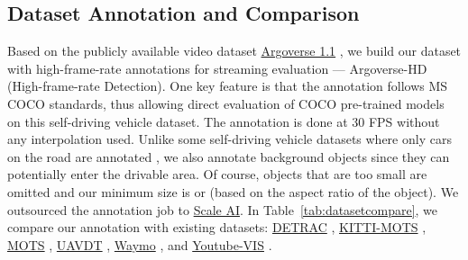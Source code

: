 \subsection{Dataset Annotation and Comparison}
\label{app:datasetcompare}

Based on the publicly available video dataset \href{https://www.argoverse.org/}{Argoverse 1.1} \cite{Argoverse}, we build our dataset with high-frame-rate annotations for streaming evaluation --- Argoverse-HD (High-frame-rate Detection). One key feature is that the annotation follows MS COCO \cite{lin2014microsoft} standards, thus allowing direct evaluation of COCO pre-trained models on this self-driving vehicle dataset. The annotation is done at 30 FPS without any interpolation used. Unlike some self-driving vehicle datasets where only cars on the road are annotated \cite{Voigtlaender19CVPR_MOTS}, we also annotate background objects since they can potentially enter the drivable area. Of course, objects that are too small are omitted and our minimum size is  or  (based on the aspect ratio of the object). We outsourced the annotation job to \href{https://scale.com/}{Scale AI}. In Table~\ref{tab:datasetcompare}, we compare our annotation with existing datasets:
\href{https://detrac-db.rit.albany.edu/Tracking}{DETRAC} \cite{DETRAC:CoRR:WenDCLCQLYL15},
\href{http://www.vision.rwth-aachen.de/page/mots}{KITTI-MOTS} \cite{Voigtlaender19CVPR_MOTS},
\href{http://www.vision.rwth-aachen.de/page/mots}{MOTS} \cite{Voigtlaender19CVPR_MOTS},
\href{https://sites.google.com/site/daviddo0323/projects/uavdt}{UAVDT} \cite{Du2018TheUA},
\href{https://waymo.com/open/about/}{Waymo} \cite{sun2019scalability}, and
\href{https://youtube-vos.org/dataset/vis/}{Youtube-VIS} \cite{Yang2019VideoIS}.

